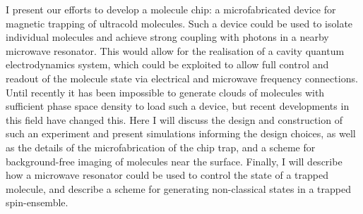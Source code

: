 I present our efforts to develop a molecule chip: a microfabricated
device for magnetic trapping of ultracold molecules. Such a device could be
used to isolate individual molecules and achieve strong coupling with photons
in a nearby microwave resonator. This would allow for the realisation of a
cavity quantum electrodynamics system, which could be exploited to allow full
control and readout of the molecule state via electrical and microwave
frequency connections. Until recently it has been impossible to generate clouds
of molecules with sufficient phase space density to load such a device, but
recent developments in this field have changed this. Here I will discuss the
design and construction of such an experiment and present simulations informing
the design choices, as well as the details of the microfabrication of the chip
trap, and a scheme for background-free imaging of molecules near the surface.
Finally, I will describe how a microwave resonator could be used to control the
state of a trapped molecule, and describe a scheme for generating non-classical
states in a trapped spin-ensemble.
